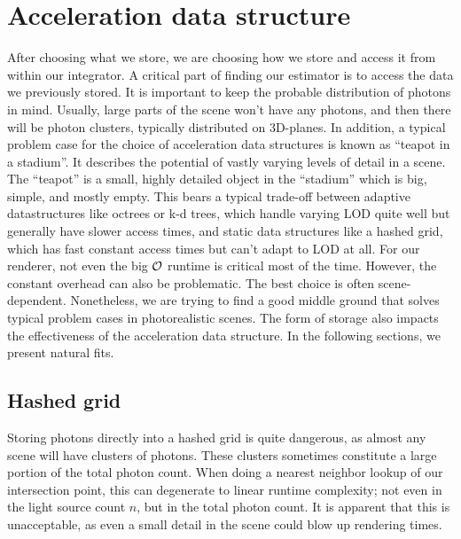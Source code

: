 \section{Acceleration data structure}
\label{ch:AccelDat}

After choosing what we store, we are choosing how we store and access it from within our integrator. A critical part of finding our estimator is to access the data we previously stored. It is important to keep the probable distribution of photons in mind. Usually, large parts of the scene won't have any photons, and then there will be photon clusters, typically distributed on 3D-planes. In addition, a typical problem case for the choice of acceleration data structures is known as \enquote{teapot in a stadium}. It describes the potential of vastly varying levels of detail in a scene. The \enquote{teapot} is a small, highly detailed object in the \enquote{stadium} which is big, simple, and mostly empty. This bears a typical trade-off between adaptive datastructures like octrees or k-d trees, which handle varying LOD quite well but generally have slower access times, and static data structures like a hashed grid, which has fast constant access times but can't adapt to LOD at all. For our renderer, not even the big $\mathcal{O}$ runtime is critical most of the time. However, the constant overhead can also be problematic. The best choice is often scene-dependent. Nonetheless, we are trying to find a good middle ground that solves typical problem cases in photorealistic scenes. The form of storage also impacts the effectiveness of the acceleration data structure. In the following sections, we present natural fits.

\subsection{Hashed grid}
\label{ch:pnee:hashedgrid}
Storing photons directly into a hashed grid is quite dangerous, as almost any scene will have clusters of photons. These clusters sometimes constitute a large portion of the total photon count. When doing a nearest neighbor lookup of our intersection point, this can degenerate to linear runtime complexity; not even in the light source count $n$, but in the total photon count. It is apparent that this is unacceptable, as even a small detail in the scene could blow up rendering times.


